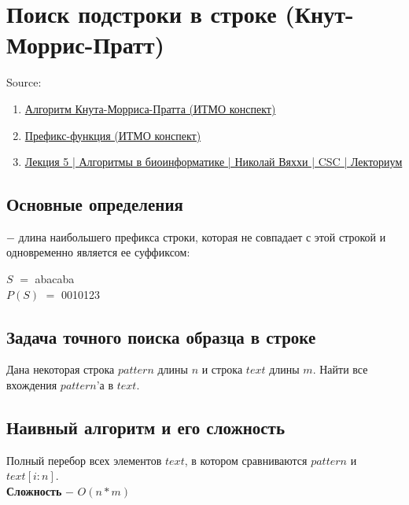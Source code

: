 \newpage
\section{Поиск подстроки в строке (Кнут-Моррис-Пратт)}
    Source:
    \begin{enumerate}
        \item \href{https://neerc.ifmo.ru/wiki/index.php?title=Алгоритм_Кнута-Морриса-Пратта}{Алгоритм Кнута-Морриса-Пратта (ИТМО конспект)}
        \item \href{https://neerc.ifmo.ru/wiki/index.php?title=Префикс-функция}{Префикс-функция (ИТМО конспект)}
        \item \href{https://youtu.be/j51rfmaE1dY?t=342}{Лекция 5 | Алгоритмы в биоинформатике | Николай Вяххи | CSC | Лекториум}
    \end{enumerate}

    \subsection{Основные определения}
        \begin{definition}
             $-$ длина наибольшего префикса строки, которая не совпадает с этой строкой и одновременно является ее суффиксом:
            \begin{center}
                $S$ $=$ abacaba\\
                $P(S)$ $=$ 0010123
            \end{center}
        \end{definition}
    
    \subsection{Задача точного поиска образца в строке}
        Дана некоторая строка $pattern$ длины $n$ и строка $text$ длины $m$. Найти все вхождения $pattern$'а в $text$.
    
    \subsection{Наивный алгоритм и его сложность}
        Полный перебор всех элементов $text$, в котором сравниваются $pattern$ и $text[i:n]$.\\

        \textbf{Сложность} $-$ $O(n*m)$
    
